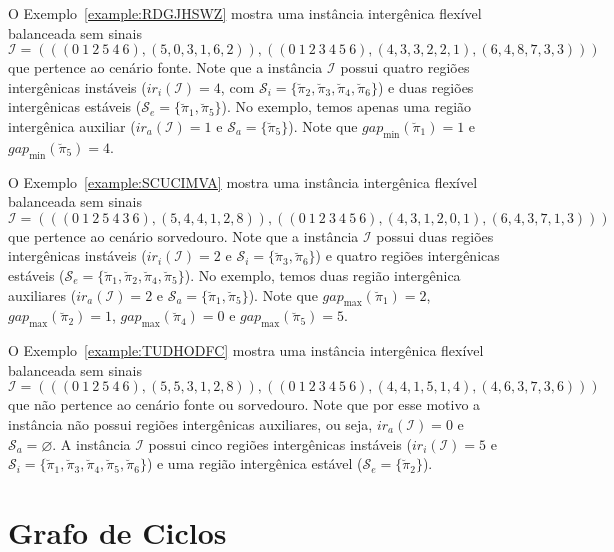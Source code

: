 O Exemplo~\ref{example:RDGJHSWZ} mostra uma instância intergênica flexível balanceada sem sinais $\mathcal{I} = (((0~1~2~5~4~6),(5,0,3,1,6,2)),((0~1~2~3~4~5~6),(4,3,3,2,2,1),(6,4,8,7,3,3)))$ que pertence ao cenário fonte. Note que a instância $\mathcal{I}$ possui quatro regiões intergênicas instáveis ($ir_i(\mathcal{I}) = 4$, com $\mathcal{S}_{i}=\{\breve\pi_2,\breve\pi_3,\breve\pi_4,\breve\pi_6\}$) e duas regiões intergênicas estáveis ($\mathcal{S}_{e}=\{\breve\pi_1,\breve\pi_5\}$). No exemplo, temos apenas uma região intergênica auxiliar ($ir_a(\mathcal{I}) = 1$ e $\mathcal{S}_{a}=\{\breve\pi_5\}$). Note que $gap_{\min}(\breve\pi_1) = 1$ e $gap_{\min}(\breve\pi_5) = 4$.



O Exemplo~\ref{example:SCUCIMVA} mostra uma instância intergênica flexível balanceada sem sinais $\mathcal{I} = (((0~1~2~5~4~3~6),(5,4,4,1,2,8)),((0~1~2~3~4~5~6),(4,3,1,2,0,1),(6,4,3,7,1,3)))$ que pertence ao cenário sorvedouro. Note que a instância $\mathcal{I}$ possui duas regiões intergênicas instáveis ($ir_i(\mathcal{I}) = 2$ e $\mathcal{S}_{i}=\{\breve\pi_3,\breve\pi_6\}$) e quatro regiões intergênicas estáveis ($\mathcal{S}_{e}=\{\breve\pi_1,\breve\pi_2,\breve\pi_4,\breve\pi_5\}$). No exemplo, temos duas região intergênica auxiliares ($ir_a(\mathcal{I}) = 2$ e $\mathcal{S}_{a}=\{\breve\pi_1,\breve\pi_5\}$). Note que $gap_{\max}(\breve\pi_1) = 2$, $gap_{\max}(\breve\pi_2) = 1$, $gap_{\max}(\breve\pi_4) = 0$ e $gap_{\max}(\breve\pi_5) = 5$.



O Exemplo~\ref{example:TUDHODFC} mostra uma instância intergênica flexível balanceada sem sinais $\mathcal{I} = (((0~1~2~5~4~6),(5,5,3,1,2,8)),((0~1~2~3~4~5~6),(4,4,1,5,1,4),(4,6,3,7,3,6)))$ que não pertence ao cenário fonte ou sorvedouro. Note que por esse motivo a instância não possui regiões intergênicas auxiliares, ou seja, $ir_a(\mathcal{I}) = 0$ e $\mathcal{S}_{a}=\varnothing$. A instância $\mathcal{I}$ possui cinco regiões intergênicas instáveis ($ir_i(\mathcal{I}) = 5$ e $\mathcal{S}_{i}=\{\breve\pi_1,\breve\pi_3,\breve\pi_4,\breve\pi_5,\breve\pi_6\}$) e uma região intergênica estável ($\mathcal{S}_{e}=\{\breve\pi_2\}$).



\section{Grafo de Ciclos}

